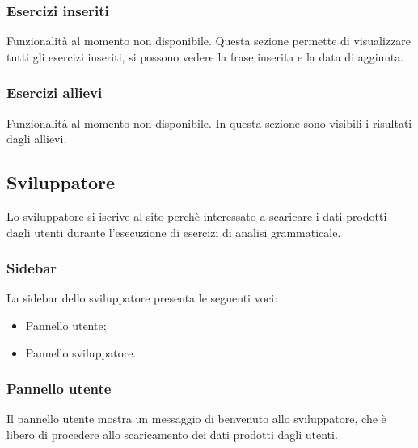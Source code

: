         
        
        \subsubsection{Esercizi inseriti}
        
        Funzionalità al momento non disponibile. Questa sezione permette di visualizzare tutti gli esercizi inseriti, si possono vedere la frase inserita e la data di aggiunta.
        
        
        
        
        \subsubsection{Esercizi allievi}        
         Funzionalità al momento non disponibile. In questa sezione sono visibili i risultati dagli allievi.
        
        
        
        
	\newpage
    \subsection{Sviluppatore}
    Lo sviluppatore si iscrive al sito perchè interessato a scaricare i dati prodotti dagli utenti durante l'esecuzione di esercizi di analisi grammaticale.
    	\subsubsection{Sidebar} 
    	  La sidebar dello sviluppatore presenta le seguenti voci:
    		\begin{itemize}
    			\item Pannello utente;
    			\item Pannello sviluppatore.
    		\end{itemize}
    
    
    
    
    	\subsubsection{Pannello utente}
    	  Il pannello utente mostra un messaggio di benvenuto allo sviluppatore, che è libero di procedere allo scaricamento dei dati prodotti dagli utenti.



